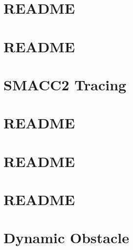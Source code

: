 \let\mypdfximage\pdfximage\def\pdfximage{\immediate\mypdfximage}\documentclass[twoside]{book}
\newcommand{\+}{\discretionary{\mbox{\scriptsize$\hookleftarrow$}}{}{}}
\begin{document}
\chapter{README}
\label{md_smacc2_performance_tools_performance_tests_sm_atomic_subscribers_performance_test_README}

\chapter{README}
\label{md_smacc2_performance_tools_performance_tests_sm_coretest_transition_speed_1_README}

\chapter{SMACC2 Tracing}
\label{md_smacc2_performance_tools_tracing_tools_README}

\chapter{README}
\label{md_smacc2_sm_reference_library__smacc2_sm_template_README}

\chapter{README}
\label{md_smacc2_sm_reference_library_sm_advanced_recovery_1_README}

\chapter{README}
\label{md_smacc2_sm_reference_library_sm_atomic_README}

\chapter{Dynamic Obstacle}
\label{md_smacc2_sm_reference_library_sm_aws_warehouse_navigation_models_dynamic_obstacle_README}

\end{document}
